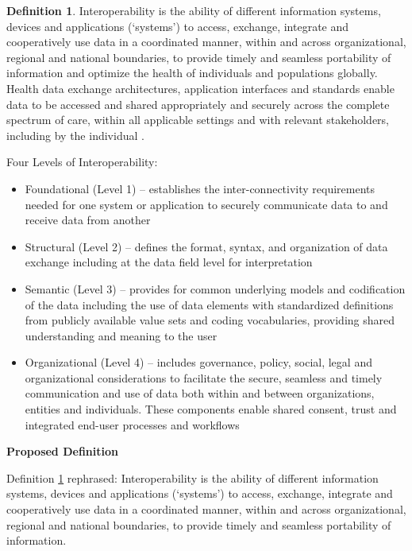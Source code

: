 \documentclass[letterpaper,cleveref]{lipics-v2019}
\theoremstyle{definition}
\newtheorem{defn}{Definition}
\begin{document}
\begin{defn}
\label{InteroperabilitySelected}
Interoperability is the ability of different information systems, devices and
applications (‘systems’) to access, exchange, integrate and cooperatively use
data in a coordinated manner, within and across organizational, regional and
national boundaries, to provide timely and seamless portability of information
and optimize the health of individuals and populations globally. Health data
exchange architectures, application interfaces and standards enable data to be
accessed and shared appropriately and securely across the complete spectrum of
care, within all applicable settings and with relevant stakeholders, including
by the individual \citep{HIMSS2019}.
        
Four Levels of Interoperability:
\begin{itemize}
\item Foundational (Level 1) – establishes the inter-connectivity requirements
needed for one system or application to securely communicate data to and receive
data from another

\item Structural (Level 2) – defines the format, syntax, and organization of
data exchange including at the data field level for interpretation

\item Semantic (Level 3) – provides for common underlying models and
codification of the data including the use of data elements with standardized
definitions from publicly available value sets and coding vocabularies,
providing shared understanding and meaning to the user

\item Organizational (Level 4) – includes governance, policy, social, legal and
organizational considerations to facilitate the secure, seamless and timely
communication and use of data both within and between organizations, entities
and individuals. These components enable shared consent, trust and integrated
end-user processes and workflows
\end{itemize}
\end{defn}

\noindent \textbf{Proposed Definition}

Definition \ref{InteroperabilitySelected}
rephrased: Interoperability is the ability of different information systems,
devices and applications (‘systems’) to access, exchange, integrate and
cooperatively use data in a coordinated manner, within and across
organizational, regional and national boundaries, to provide timely and seamless
portability of information.
\end{document}
